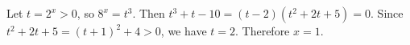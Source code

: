 Let $t=2^x>0$, so $8^x=t^3$. Then $t^3+t-10=(t-2)(t^2+2t+5)=0$. Since $t^2+2t+5=(t+1)^2+4>0$, we have $t=2$. Therefore $\boxed{x=1}$.
